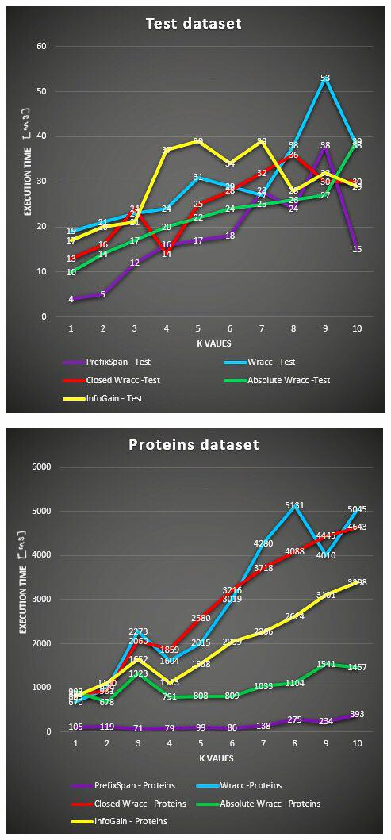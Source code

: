 \documentclass[10pt, a4paper]{article}
\begin{document}
	\begin{multicols}{2}
	\includegraphics[scale=0.5]{tests.jpg}\par\vspace{1cm}
	\includegraphics[scale=0.5]{proteins.jpg}\par\vspace{1cm}	
    \end{multicols}
\end{document}
